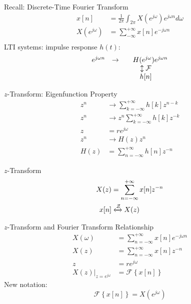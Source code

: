 \begin{frame}{Recall: Discrete-Time Fourier Transform}
    \begin{align*}
        x[n] &= \frac{1}{2\pi}\int_{2\pi}X(e^{j\omega})e^{j\omega n}d\omega\\
        X(e^{j\omega}) &= \sum_{-\infty}^{+\infty}x[n]e^{-j\omega n}\\
    \end{align*}
    LTI systems: impulse response $h(t)$:
    \begin{equation*}
        \begin{matrix}
            e^{j\omega n} & \rightarrow & \quad H(e^{j\omega})e^{j\omega n} \\
            && \negthickspace\updownarrow{\mathcal{F}}\\
            && \negthickspace h[n]\\
        \end{matrix}
    \end{equation*}
\end{frame}


\begin{frame}{$z$-Transform: Eigenfunction Property}
    \begin{align*}
        z^{n} &\rightarrow \sum_{k=-\infty}^{+\infty}h[k]z^{n-k}\\
        z^{n} &\rightarrow z^{n}\sum_{k=-\infty}^{+\infty}h[k]z^{-k}\\
        z &= re^{j\omega}\\
        z^{n}   &\rightarrow H(z) z^{n}\\
        H(z) &= \sum_{n=-\infty}^{+\infty}h[n]z^{-n}
    \end{align*}
\end{frame}


\begin{frame}{$z$-Transform}
    \begin{align*}
        X(z) &= \sum_{n=-\infty}^{+\infty}x[n]z^{-n}\\
        x[n] &\xleftrightarrow{\mathcal{Z}} X(z)
    \end{align*}
\end{frame}


\begin{frame}{$z$-Transform and Fourier Transform Relationship}
    \begin{align*}
        X(\omega) &= \sum_{n=-\infty}^{+\infty}x[n]e^{-j\omega n}\\
        X(z) &= \sum_{n=-\infty}^{+\infty}x[n]z^{-n}\\
        z &= re^{j\omega}\\
        \left.X(z)\right|_{z=e^{j\omega}} &= \mathcal{F}\left\{ x[n]\right\}
    \end{align*}
    New notation:
    \begin{equation*}
        \mathcal{F}\left\{ x[n]\right\} = X(e^{j\omega})
    \end{equation*}
\end{frame}

